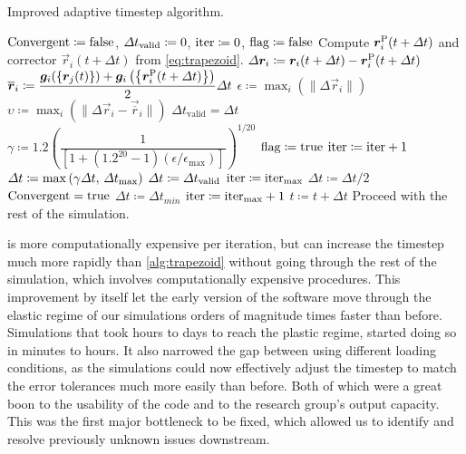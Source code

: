 \begin{algorithm}
    \caption{Improved adaptive timestep algorithm.}
    \label{alg:trapezoid_improved}
    \begin{algorithmic}
        \State $\textrm{Convergent} \coloneqq \textrm{false}$, $\Delta t_{\textrm{valid}} \coloneqq 0$, $\textrm{iter} \coloneqq 0$, $\textrm{flag} \coloneqq \textrm{false}$
        \State Compute $\vec{r}_i^{\rvar{P}}(t + \Delta t)$ and corrector $\vec{r}_i(t + \Delta t)$ from \cref{eq:trapezoid}.
        \State $\Delta \vec{r}_i \coloneqq \vec{r}_i(t + \Delta t) - \vec{r}_i^{\rvar{P}}(t + \Delta t)$
        \State $\vec{\overline{r}}_i \coloneqq \dfrac{\vec{g}_i(\left\{\vec{r}_j(t)\right\}) + \vec{g}_i\left(\left\{\vec{r}_i^{\rvar{P}}(t + \Delta t)\right\}\right)}{2}\Delta t$
        \State $\epsilon \coloneqq \max_i\left(\lVert \Delta \vec{r}_i \rVert \right)$
        \State $\upsilon \coloneqq \max_i\left(\lVert \Delta \vec{r}_i - \vec{\overline{r}}_i \rVert\right)$
        \State $\Delta t_{\textrm{valid}} = \Delta t$
        \State $\gamma \coloneqq 1.2\left(\dfrac{1}{\left[1 + (1.2^{20} - 1) (\epsilon / \epsilon_{\textrm{max}})\right]}\right)^{1/20}$
        \State $\textrm{flag} \coloneqq \textrm{true}$
        \State $\textrm{iter} \coloneqq \textrm{iter} + 1$
        \State $\Delta t \coloneqq \max\left(\gamma \Delta t,\, \Delta t_{\textrm{max}}\right)$
        \Else
        \State $\Delta t \coloneqq \Delta t_{\textrm{valid}}$
        \State $\textrm{iter} \coloneqq \textrm{iter}_{\textrm{max}}$
        \Else
        \State $\Delta t \coloneqq \Delta t / 2$
        \EndIf
        \EndIf
        \State $\textrm{Convergent} = \textrm{true}$
        \EndIf
        \State $\Delta t \coloneqq \Delta t_{min}$
        \State $\textrm{iter} \coloneqq \textrm{iter}_{\textrm{max}} + 1$
        \EndIf
        \EndWhile
        \State $t \coloneqq t + \Delta t$
        \State Proceed with the rest of the simulation.
    \end{algorithmic}
\end{algorithm}

 is more computationally expensive per iteration, but can increase the timestep much more rapidly than \cref{alg:trapezoid} without going through the rest of the simulation, which involves computationally expensive procedures. This improvement by itself let the early version of the software move through the elastic regime of our simulations orders of magnitude times faster than before. Simulations that took hours to days to reach the plastic regime, started doing so in minutes to hours. It also narrowed the gap between using different loading conditions, as the simulations could now effectively adjust the timestep to match the error tolerances much more easily than before. Both of which were a great boon to the usability of the code and to the research group's output capacity. This was the first major bottleneck to be fixed, which allowed us to identify and resolve previously unknown issues downstream.

